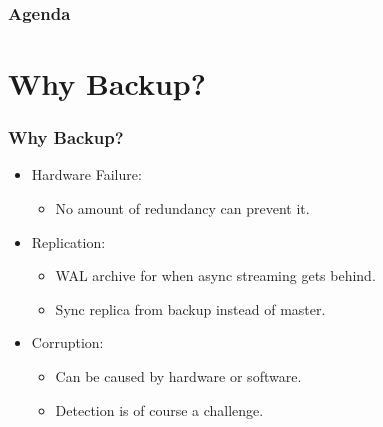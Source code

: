 %
\def\mytitle{Efficiently Backing up Terabytes of Data with pgBackRest}
\def\mysubject{}
\def\myevent{PostgresOpen 2016}
\def\myauthor{David Steele}
\def\myemail{}
\def\mydate{September 14, 2016}

\def\mysuppressnav{}

\def\mytemplatepath{/template/}


\begin{frame}
    \frametitle{Agenda}
    \tableofcontents
\end{frame}

\section{Why Backup?}

\begin{frame}
    \frametitle{Why Backup?}

    \begin{itemize}
        \item Hardware Failure:

        \begin{itemize}
            \item No amount of redundancy can prevent it.\pause
        \end{itemize}

        \item Replication:

        \begin{itemize}
            \item WAL archive for when async streaming gets behind.\pause
            \item Sync replica from backup instead of master.\pause
        \end{itemize}

        \item Corruption:

        \begin{itemize}
            \item Can be caused by hardware or software.\pause
            \item Detection is of course a challenge.
        \end{itemize}
    \end{itemize}
\end{frame}

